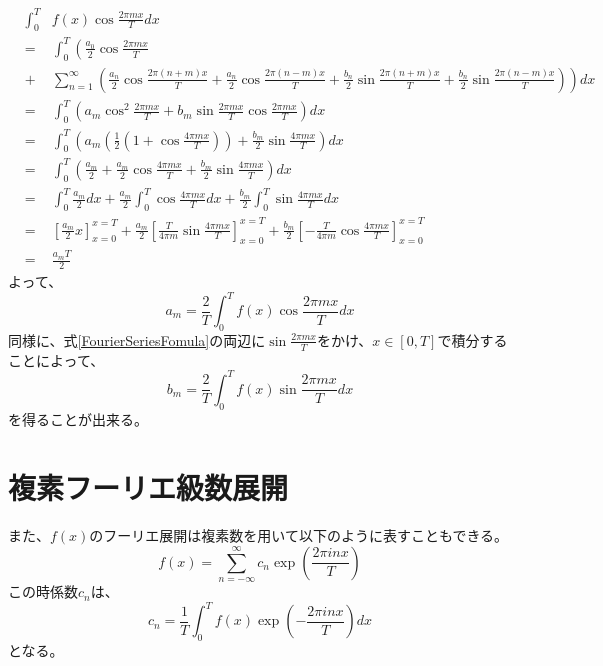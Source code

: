 \documentclass[a4paper]{jsarticle}
\begin{document}
\begin{eqnarray}
	&{\int _0 ^T}& f \left( x \right) \cos \frac { 2 \pi mx } { T } dx \nonumber \\
	&=& \int _0 ^T \left( \frac { a_0 } { 2 } \cos \frac { 2 \pi mx } { T } \right. \nonumber \\
	&+& \left. \sum _{ n = 1} ^\infty \left( \frac { a_n } { 2 } \cos \frac { 2 \pi \left( n + m \right) x } { T } + \frac { a_n } { 2 } \cos \frac { 2 \pi \left( n - m \right) x } { T } + \frac { b_n } { 2 } \sin \frac { 2 \pi \left( n + m \right) x } { T } + \frac { b_n } { 2 } \sin \frac { 2 \pi \left( n - m \right) x } { T } \right) \right) dx \nonumber \\
	&=& \int _0 ^T \left( a_m \cos ^2 \frac { 2 \pi mx } { T } + b_m \sin \frac { 2 \pi mx } { T } \cos \frac { 2 \pi mx } { T } \right) dx \nonumber \\
	&=& \int _0 ^T \left( a_m \left( \frac { 1 } { 2 } \left( 1 + \cos \frac { 4 \pi mx } { T } \right) \right) + \frac { b_m } { 2 } \sin \frac { 4 \pi mx } { T } \right) dx \nonumber \\
	&=& \int _0 ^T \left( \frac { a_m } { 2 } + \frac { a_m } { 2 } \cos \frac { 4 \pi mx } { T } + \frac { b_m } { 2 } \sin \frac { 4 \pi mx } { T } \right) dx \nonumber \\
	&=& \int _0 ^T \frac { a_m } { 2 } dx + \frac { a_m } { 2 } \int _0 ^T \cos \frac { 4 \pi mx } { T } dx + \frac { b_m } { 2 } \int _0 ^T \sin \frac { 4 \pi mx } { T } dx \nonumber \\
	&=& \left[ \frac { a_m } { 2 } x \right] _{ x = 0 } ^{ x = T } + \frac { a_m } { 2 } \left[ \frac { T } { 4 \pi m } \sin \frac { 4 \pi mx } { T } \right] _{ x = 0 } ^{ x = T } + \frac { b_m } { 2 } \left[ - \frac { T } { 4 \pi m } \cos \frac { 4 \pi mx } { T } \right] _{ x = 0 } ^{ x = T } \nonumber \\
	&=& \frac { a_mT } { 2 }
\end{eqnarray}
よって、
\begin{equation}
a_m = \frac { 2 } { T } \int _0 ^T f \left( x \right) \cos \frac { 2 \pi mx } { T } dx
\end{equation}
同様に、式\ref{FourierSeriesFomula}の両辺に$\sin \frac { 2 \pi mx } { T }$をかけ、$x \in \left[ 0,T \right]$で積分することによって、
\begin{equation}
b_m = \frac { 2 } { T } \int _0 ^T f \left( x \right) \sin \frac { 2 \pi mx } { T } dx
\end{equation}
を得ることが出来る。
\section{複素フーリエ級数展開}
また、$ f \left( x \right) $のフーリエ展開は複素数を用いて以下のように表すこともできる。
\begin{equation}
\label{ComplexFourierSeriesFomula}
f \left( x \right) = \sum _{ n = - \infty } ^\infty c_n \exp \left( \frac { 2 \pi inx } { T } \right)
\end{equation}
この時係数$ c_n $は、
\begin{equation}
c_n = \frac { 1 } { T } \int _0 ^T f \left( x \right) \exp \left( - \frac { 2 \pi inx } { T } \right) dx
\end{equation}
となる。
\end{document}
